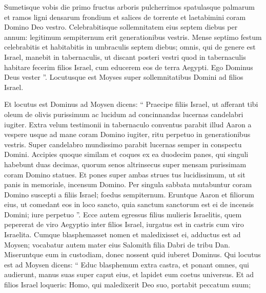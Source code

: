 \begin{biblechapter}
\begin{biblechapter}
\begin{biblechapter}
\begin{biblechapter}
\begin{biblechapter}
\begin{biblechapter}
\begin{biblechapter}
\begin{biblechapter}
\begin{biblechapter}
\begin{biblechapter}
\begin{biblechapter}
\begin{biblechapter}
\begin{biblechapter}
\begin{biblechapter}
\begin{biblechapter}
\begin{biblechapter}
\begin{biblechapter}
\begin{biblechapter}
\begin{biblechapter}
\begin{biblechapter}
\begin{biblechapter}
\begin{biblechapter}
\begin{biblechapter}
\verse Sumetisque vobis die primo fructus arboris pulcherrimos spatulasque palmarum et ramos ligni densarum frondium et salices de torrente et laetabimini coram Domino Deo vestro. 
\verse Celebrabitisque sollemnitatem eius septem diebus per annum: legitimum sempiternum erit generationibus vestris. Mense septimo festum celebrabitis 
\verse et habitabitis in umbraculis septem diebus; omnis, qui de genere est Israel, manebit in tabernaculis, 
\verse ut discant posteri vestri quod in tabernaculis habitare fecerim filios Israel, cum educerem eos de terra Aegypti. Ego Dominus Deus vester ”.
 \verse Locutusque est Moyses super sollemnitatibus Domini ad filios Israel.
 
\begin{biblechapter}
\verse Et locutus est Dominus ad Moysen dicens: 
\verse “ Praecipe filiis Israel, ut afferant tibi oleum de olivis purissimum ac lucidum ad concinnandas lucernas candelabri iugiter. 
\verse Extra velum testimonii in tabernaculo conventus parabit illud Aaron a vespere usque ad mane coram Domino iugiter, ritu perpetuo in generationibus vestris. 
\verse Super candelabro mundissimo parabit lucernas semper in conspectu Domini.
 \verse Accipies quoque similam et coques ex ea duodecim panes, qui singuli habebunt duas decimas, 
\verse quorum senos altrinsecus super mensam purissimam coram Domino statues. 
\verse Et pones super ambas strues tus lucidissimum, ut sit panis in memoriale, incensum Domino. 
\verse Per singula sabbata mutabuntur coram Domino suscepti a filiis Israel; foedus sempiternum. 
\verse Eruntque Aaron et filiorum eius, ut comedant eos in loco sancto, quia sanctum sanctorum est ei de incensis Domini; iure perpetuo ”.
 \verse Ecce autem egressus filius mulieris Israelitis, quem pepererat de viro Aegyptio inter filios Israel, iurgatus est in castris cum viro Israelita. 
\verse Cumque blasphemasset nomen et maledixisset ei, adductus est ad Moysen; vocabatur autem mater eius Salomith filia Dabri de tribu Dan. 
\verse Miseruntque eum in custodiam, donec nossent quid iuberet Dominus. 
\verse Qui locutus est ad Moysen dicens: 
\verse “ Educ blasphemum extra castra, et ponant omnes, qui audierunt, manus suas super caput eius, et lapidet eum coetus universus. 
\verse Et ad filios Israel loqueris:
 Homo, qui maledixerit Deo suo, portabit peccatum suum; 

\end{biblechapter}
\end{biblechapter}
\end{biblechapter}
\end{biblechapter}
\end{biblechapter}
\end{biblechapter}
\end{biblechapter}
\end{biblechapter}
\end{biblechapter}
\end{biblechapter}
\end{biblechapter}
\end{biblechapter}
\end{biblechapter}
\end{biblechapter}
\end{biblechapter}
\end{biblechapter}
\end{biblechapter}
\end{biblechapter}
\end{biblechapter}
\end{biblechapter}
\end{biblechapter}
\end{biblechapter}
\end{biblechapter}
\end{biblechapter}
